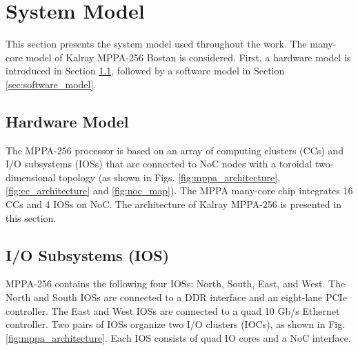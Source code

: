 \chapter{System Model}
\label{sec:system_model}


This section presents the system model used throughout the work.
The many-core model of Kalray MPPA-256 Bostan is considered.
First, a hardware model is introduced in Section \ref{sec:hardware_model}, followed by a software model in Section \ref{sec:software_model}.



\section{Hardware Model}
\label{sec:hardware_model}
The MPPA-256 processor is based on an array of computing clusters (CCs) and I/O subsystems (IOSs) that are connected to NoC nodes with a toroidal two-dimensional topology 
(as shown in Figs. \ref{fig:mppa_architecture}, \ref{fig:cc_architecture} and \ref{fig:noc_map}).
The MPPA many-core chip integrates 16 CCs and 4 IOSs on NoC.
The architecture of Kalray MPPA-256 is presented in this section.

\section{I/O Subsystems (IOS)}
\label{sec:ios}
MPPA-256 contains the following four IOSs: North, South, East, and West.
The North and South IOSs are connected to a DDR interface and an eight-lane PCIe controller.
The East and West IOSs are connected to a quad 10 Gb/s Ethernet controller.
Two pairs of IOSs organize two I/O clusters (IOCs), as shown in Fig. \ref{fig:mppa_architecture}.
Each IOS consists of quad IO cores and a NoC interface.

